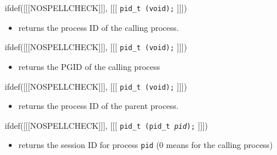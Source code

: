 \begin{slide}
ifdef([[[NOSPELLCHECK]]], [[[
\texttt{pid\_t (void);}
]]])
\begin{itemize}
\item returns the process ID of the calling process.
\end{itemize}
ifdef([[[NOSPELLCHECK]]], [[[
\texttt{pid\_t (void);}
]]])
\begin{itemize}
\item returns the PGID of the calling process
\end{itemize}
ifdef([[[NOSPELLCHECK]]], [[[
\texttt{pid\_t (void);}
]]])
\begin{itemize}
\item returns the process ID of the parent process.
\end{itemize}
ifdef([[[NOSPELLCHECK]]], [[[
\texttt{pid\_t (pid\_t \emph{pid});}
]]])
\begin{itemize}
\item returns the session ID for process \texttt{pid} (0 means for the calling
process)
\end{itemize}
\end{slide}


